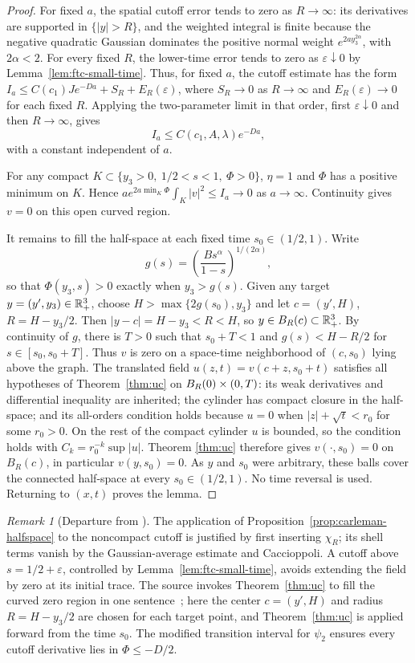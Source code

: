 \documentclass[11pt,letterpaper]{article}
\numberwithin{equation}{section}
\theoremstyle{plain}
\theoremstyle{definition}
\theoremstyle{remark}
\newtheorem{remark}[theorem]{Remark}
\begin{document}
\begin{proof}
For fixed $a$, the spatial cutoff error tends to zero as $R\to\infty$: its derivatives are supported in $\{|y|>R\}$, and the weighted integral is finite because the negative quadratic Gaussian dominates the positive normal weight $e^{2a y_3^{2\alpha}}$, with $2\alpha<2$. For every fixed $R$, the lower-time error tends to zero as $\varepsilon\downarrow0$ by Lemma~\ref{lem:ftc-small-time}. Thus, for fixed $a$, the cutoff estimate has the form $I_a\leq C(c_1)J e^{-Da}+S_R+E_R(\varepsilon)$, where $S_R\to0$ as $R\to\infty$ and $E_R(\varepsilon)\to0$ for each fixed $R$. Applying the two-parameter limit in that order, first $\varepsilon\downarrow0$ and then $R\to\infty$, gives
\[
 I_a\leq C(c_1,A,\lambda)e^{-Da},
\]
with a constant independent of $a$.

For any compact $K\subset\{y_3>0,\ 1/2<s<1,\ \Phi>0\}$,
$\eta=1$ and $\Phi$ has a positive minimum on $K$. Hence
$a e^{2a\min_K\Phi}\int_K|v|^2\le I_a\to0$ as $a\to\infty$.
Continuity gives $v=0$ on this open curved region.

It remains to fill the half-space at each fixed time $s_0\in(1/2,1)$.
Write
\[
 g(s)=\left(\frac{B s^\alpha}{1-s}\right)^{1/(2\alpha)},
\]
so that $\Phi(y_3,s)>0$ exactly when $y_3>g(s)$. Given any target
$y=(y',y_3)\in\mathbb{R}^3_+$, choose $H>\max\{2g(s_0),y_3\}$ and let
$c=(y',H)$, $R=H-y_3/2$. Then $|y-c|=H-y_3<R<H$, so
$y\in B_{R}(c)\subset\mathbb{R}^3_+$. By continuity of $g$, there is $T>0$ such
that $s_0+T<1$ and $g(s)<H-R/2$ for $s\in[s_0,s_0+T]$. Thus $v$ is zero
on a space-time neighborhood of $(c,s_0)$ lying above the graph.
The translated field $u(z,t)=v(c+z,s_0+t)$ satisfies all hypotheses of
Theorem~\ref{thm:uc} on $B_{R}(0)\times(0,T)$: its weak derivatives and
differential inequality are inherited; the cylinder has compact closure in
the half-space; and its all-orders condition holds because $u=0$ when
$|z|+\sqrt{t}<r_0$ for some $r_0>0$. On the rest of the compact cylinder
$u$ is bounded, so the condition holds with $C_k=r_0^{-k}\sup|u|$. Theorem
\ref{thm:uc} therefore gives $v(\cdot,s_0)=0$ on $B_R(c)$, in particular
$v(y,s_0)=0$. As $y$ and $s_0$ were arbitrary, these balls cover the
connected half-space at every $s_0\in(1/2,1)$. No time reversal is used.
Returning to $(x,t)$ proves the lemma.
\end{proof}

\begin{remark}[Departure from \cite{ESS2003}]
The application of Proposition~\ref{prop:carleman-halfspace} to the
noncompact cutoff is justified by first inserting $\chi_R$; its shell terms
vanish by the Gaussian-average estimate and Caccioppoli. A cutoff above
$s=1/2+\varepsilon$, controlled by Lemma~\ref{lem:ftc-small-time}, avoids
extending the field by zero at its initial trace. The source invokes
Theorem~\ref{thm:uc} to fill the curved zero region in one sentence~\cite[§5, pp.~236--238]{ESS2003}; here
the center $c=(y',H)$ and radius $R=H-y_3/2$ are chosen for each target point,
and Theorem~\ref{thm:uc} is applied forward from the time $s_0$. The
modified transition interval for $\psi_2$ ensures every cutoff derivative
lies in $\Phi\le-D/2$.
\end{remark}
\end{document}
